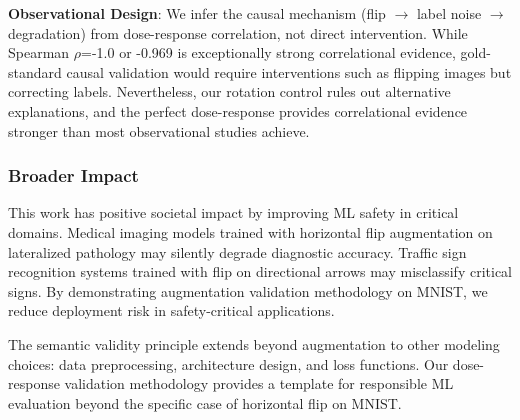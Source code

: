 \textbf{Observational Design}: We infer the causal mechanism (flip $\rightarrow$ label noise $\rightarrow$ degradation) from dose-response correlation, not direct intervention. While Spearman $\rho$=-1.0 or -0.969 is exceptionally strong correlational evidence, gold-standard causal validation would require interventions such as flipping images but correcting labels. Nevertheless, our rotation control rules out alternative explanations, and the perfect dose-response provides correlational evidence stronger than most observational studies achieve.

\subsubsection{Broader Impact}

This work has positive societal impact by improving ML safety in critical domains. Medical imaging models trained with horizontal flip augmentation on lateralized pathology may silently degrade diagnostic accuracy. Traffic sign recognition systems trained with flip on directional arrows may misclassify critical signs. By demonstrating augmentation validation methodology on MNIST, we reduce deployment risk in safety-critical applications.

The semantic validity principle extends beyond augmentation to other modeling choices: data preprocessing, architecture design, and loss functions. Our dose-response validation methodology provides a template for responsible ML evaluation beyond the specific case of horizontal flip on MNIST.

